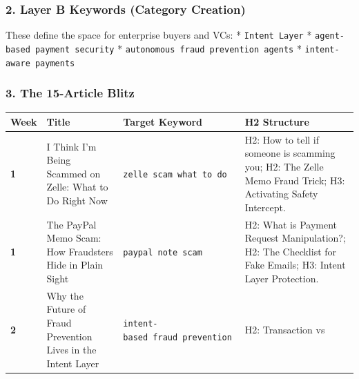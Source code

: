 \documentclass[
]{article}
\newcounter{none} %
\begin{document}
\subsubsection{2. Layer B Keywords (Category
Creation)}\label{layer-b-keywords-category-creation}

These define the space for enterprise buyers and VCs: *
\texttt{Intent\ Layer} * \texttt{agent-based\ payment\ security} *
\texttt{autonomous\ fraud\ prevention\ agents} *
\texttt{intent-aware\ payments}

\subsubsection{3. The 15-Article Blitz}\label{the-15-article-blitz}

{\def\LTcaptype{none} %
\begin{longtable}[]{@{}
  >{\raggedright\arraybackslash}p{}
  >{\raggedright\arraybackslash}p{}
  >{\raggedright\arraybackslash}p{}
  >{\raggedright\arraybackslash}p{}@{}}
\toprule\noalign{}
\begin{minipage}[b]{\linewidth}\raggedright
Week
\end{minipage} & \begin{minipage}[b]{\linewidth}\raggedright
Title
\end{minipage} & \begin{minipage}[b]{\linewidth}\raggedright
Target Keyword
\end{minipage} & \begin{minipage}[b]{\linewidth}\raggedright
H2 Structure
\end{minipage} \\
\midrule\noalign{}
\endhead
\bottomrule\noalign{}
\endlastfoot
\textbf{1} & I Think I'm Being Scammed on Zelle: What to Do Right Now &
\texttt{zelle\ scam\ what\ to\ do} & H2: How to tell if someone is
scamming you; H2: The Zelle Memo Fraud Trick; H3: Activating Safety
Intercept. \\
\textbf{1} & The PayPal Memo Scam: How Fraudsters Hide in Plain Sight &
\texttt{paypal\ note\ scam} & H2: What is Payment Request Manipulation?;
H2: The Checklist for Fake Emails; H3: Intent Layer Protection. \\
\textbf{2} & Why the Future of Fraud Prevention Lives in the Intent
Layer & \texttt{intent-based\ fraud\ prevention} & H2: Transaction vs

\end{longtable}}
\end{document}
